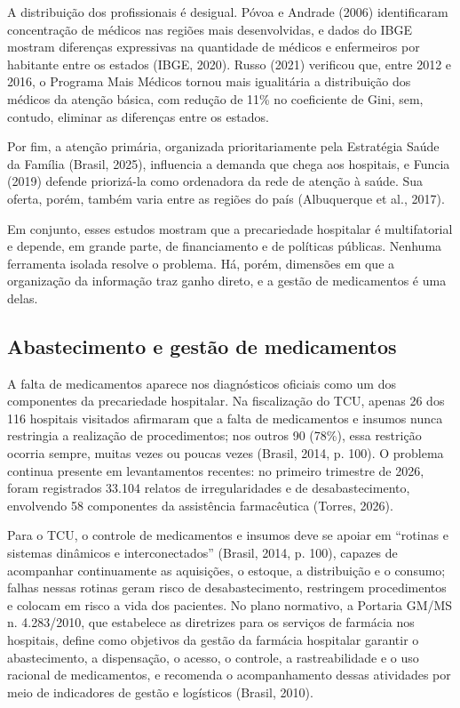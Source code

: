 \documentclass[12pt,a4paper]{article}
\begin{document}
A distribuição dos profissionais é desigual. Póvoa e Andrade (2006) identificaram concentração de médicos nas regiões mais desenvolvidas, e dados do IBGE mostram diferenças expressivas na quantidade de médicos e enfermeiros por habitante entre os estados (IBGE, 2020). Russo (2021) verificou que, entre 2012 e 2016, o Programa Mais Médicos tornou mais igualitária a distribuição dos médicos da atenção básica, com redução de 11\% no coeficiente de Gini, sem, contudo, eliminar as diferenças entre os estados.

Por fim, a atenção primária, organizada prioritariamente pela Estratégia Saúde da Família (Brasil, 2025), influencia a demanda que chega aos hospitais, e Funcia (2019) defende priorizá-la como ordenadora da rede de atenção à saúde. Sua oferta, porém, também varia entre as regiões do país (Albuquerque et al., 2017).

Em conjunto, esses estudos mostram que a precariedade hospitalar é multifatorial e depende, em grande parte, de financiamento e de políticas públicas. Nenhuma ferramenta isolada resolve o problema. Há, porém, dimensões em que a organização da informação traz ganho direto, e a gestão de medicamentos é uma delas.

\subsection{Abastecimento e gestão de medicamentos}

A falta de medicamentos aparece nos diagnósticos oficiais como um dos componentes da precariedade hospitalar. Na fiscalização do TCU, apenas 26 dos 116 hospitais visitados afirmaram que a falta de medicamentos e insumos nunca restringia a realização de procedimentos; nos outros 90 (78\%), essa restrição ocorria sempre, muitas vezes ou poucas vezes (Brasil, 2014, p. 100). O problema continua presente em levantamentos recentes: no primeiro trimestre de 2026, foram registrados 33.104 relatos de irregularidades e de desabastecimento, envolvendo 58 componentes da assistência farmacêutica (Torres, 2026).

Para o TCU, o controle de medicamentos e insumos deve se apoiar em ``rotinas e sistemas dinâmicos e interconectados'' (Brasil, 2014, p. 100), capazes de acompanhar continuamente as aquisições, o estoque, a distribuição e o consumo; falhas nessas rotinas geram risco de desabastecimento, restringem procedimentos e colocam em risco a vida dos pacientes. No plano normativo, a Portaria GM/MS n. 4.283/2010, que estabelece as diretrizes para os serviços de farmácia nos hospitais, define como objetivos da gestão da farmácia hospitalar garantir o abastecimento, a dispensação, o acesso, o controle, a rastreabilidade e o uso racional de medicamentos, e recomenda o acompanhamento dessas atividades por meio de indicadores de gestão e logísticos (Brasil, 2010).
\end{document}
